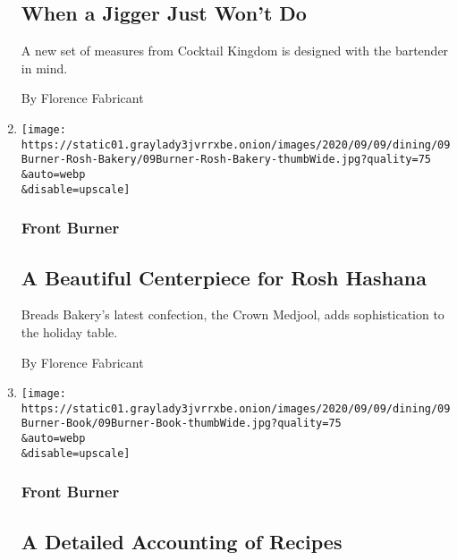 \begin{enumerate}
  \hypertarget{when-a-jigger-just-wont-do}{%
  \subsection{When a Jigger Just Won't
  Do}\label{when-a-jigger-just-wont-do}}

  A new set of measures from Cocktail Kingdom is designed with the
  bartender in mind.

  By Florence Fabricant
\item
  \href{/2020/09/07/dining/rosh-hashanah-dessert-breads-bakery.html}{}

  \texttt{[image: https://static01.graylady3jvrrxbe.onion/images/2020/09/09/dining/09Burner-Rosh-Bakery/09Burner-Rosh-Bakery-thumbWide.jpg?quality=75\\\&auto=webp\\\&disable=upscale]}

  \hypertarget{front-burner-4}{%
  \subsubsection{Front Burner}\label{front-burner-4}}

  \hypertarget{a-beautiful-centerpiece-for-rosh-hashana}{%
  \subsection{A Beautiful Centerpiece for Rosh
  Hashana}\label{a-beautiful-centerpiece-for-rosh-hashana}}

  Breads Bakery's latest confection, the Crown Medjool, adds
  sophistication to the holiday table.

  By Florence Fabricant
\item
  \href{/2020/09/07/dining/deep-flavors-book-kenneth-horwitz.html}{}

  \texttt{[image: https://static01.graylady3jvrrxbe.onion/images/2020/09/09/dining/09Burner-Book/09Burner-Book-thumbWide.jpg?quality=75\\\&auto=webp\\\&disable=upscale]}

  \hypertarget{front-burner-5}{%
  \subsubsection{Front Burner}\label{front-burner-5}}

  \hypertarget{a-detailed-accounting-of-recipes}{%
  \subsection{A Detailed Accounting of
  Recipes}\label{a-detailed-accounting-of-recipes}}


\end{enumerate}
